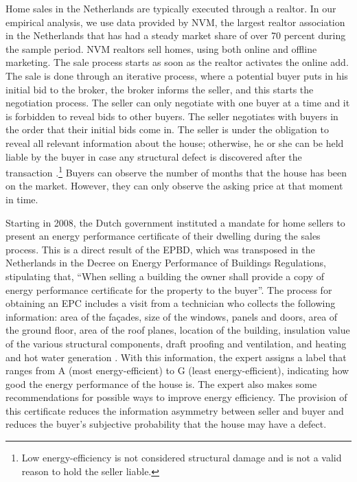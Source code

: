\documentclass[12pt]{article}
\begin{document}
Home sales in the Netherlands are typically executed through a realtor. In our empirical analysis, we use data provided by NVM, the largest realtor association in the Netherlands that has had a steady market share of over 70 percent during the sample period. NVM realtors sell homes, using both online and offline marketing. The sale process starts as soon as the realtor activates the online add. The sale is done through an iterative process, where a potential buyer puts in his initial bid to the broker, the broker informs the seller, and this starts the negotiation process. The seller can only negotiate with one buyer at a time and it is forbidden to reveal bids to other buyers. The seller negotiates with buyers in the order that their initial bids come in. The seller is under the obligation to reveal all relevant information about the house; otherwise, he or she can be held liable by the buyer in case any structural defect is discovered after the transaction \citep{de2010competing}.\footnote{Low energy-efficiency is not considered structural damage and is not a valid reason to hold the seller liable.} Buyers can observe the number of months that the house has been on the market. However, they can only observe the asking price at that moment in time.

Starting in 2008, the Dutch government instituted a mandate for home sellers to present an energy performance certificate of their dwelling during the sales process. This is a direct result of the EPBD, which was transposed in the Netherlands in the Decree on Energy Performance of Buildings Regulations, stipulating that, “When selling a building the owner shall provide a copy of energy performance certificate for the property to the buyer”. The process for obtaining an EPC includes a visit from a technician who collects the following information: area of the façades, size of the windows, panels and doors, area of the ground floor, area of the roof planes, location of the building, insulation value of the various structural components, draft proofing and ventilation, and heating and hot water generation \citep{plateringen2013het}. With this information, the expert assigns a label that ranges from A (most energy-efficient) to G (least energy-efficient), indicating how good the energy performance of the house is. The expert also makes some recommendations for possible ways to improve energy efficiency. The provision of this certificate reduces the information asymmetry between seller and buyer and reduces the buyer's subjective probability that the house may have a defect. 
\end{document}

